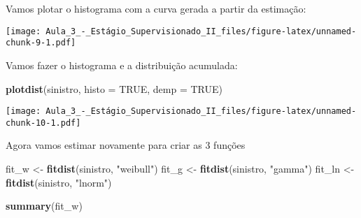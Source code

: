 \documentclass[]{article}
\newenvironment{Shaded}{\begin{snugshade}}{\end{snugshade}}
\newcommand{\DataTypeTok}[1]{\textcolor[rgb]{0.13,0.29,0.53}{#1}}
\newcommand{\DecValTok}[1]{\textcolor[rgb]{0.00,0.00,0.81}{#1}}
\newcommand{\KeywordTok}[1]{\textcolor[rgb]{0.13,0.29,0.53}{\textbf{#1}}}
\newcommand{\NormalTok}[1]{#1}
\newcommand{\OperatorTok}[1]{\textcolor[rgb]{0.81,0.36,0.00}{\textbf{#1}}}
\newcommand{\OtherTok}[1]{\textcolor[rgb]{0.56,0.35,0.01}{#1}}
\newcommand{\StringTok}[1]{\textcolor[rgb]{0.31,0.60,0.02}{#1}}
\begin{document}
Vamos plotar o histograma com a curva gerada a partir da estimação:

\begin{Shaded}
\end{Shaded}

\texttt{[image: Aula\_3\_-\_Estágio\_Supervisionado\_II\_files/figure-latex/unnamed-chunk-9-1.pdf]}

Vamos fazer o histograma e a distribuição acumulada:

\begin{Shaded}
\begin{Highlighting}[]
\KeywordTok{plotdist}\NormalTok{(sinistro, }\DataTypeTok{histo =} \OtherTok{TRUE}\NormalTok{, }\DataTypeTok{demp =} \OtherTok{TRUE}\NormalTok{)}
\end{Highlighting}
\end{Shaded}

\texttt{[image: Aula\_3\_-\_Estágio\_Supervisionado\_II\_files/figure-latex/unnamed-chunk-10-1.pdf]}

Agora vamos estimar novamente para criar as 3 funções

\begin{Shaded}
\begin{Highlighting}[]
\NormalTok{fit_w  <-}\StringTok{ }\KeywordTok{fitdist}\NormalTok{(sinistro, }\StringTok{"weibull"}\NormalTok{)}
\NormalTok{fit_g  <-}\StringTok{ }\KeywordTok{fitdist}\NormalTok{(sinistro, }\StringTok{"gamma"}\NormalTok{)}
\NormalTok{fit_ln <-}\StringTok{ }\KeywordTok{fitdist}\NormalTok{(sinistro, }\StringTok{"lnorm"}\NormalTok{)}
\end{Highlighting}
\end{Shaded}

\begin{Shaded}
\begin{Highlighting}[]
\KeywordTok{summary}\NormalTok{(fit_w)}
\end{Highlighting}
\end{Shaded}
\end{document}
